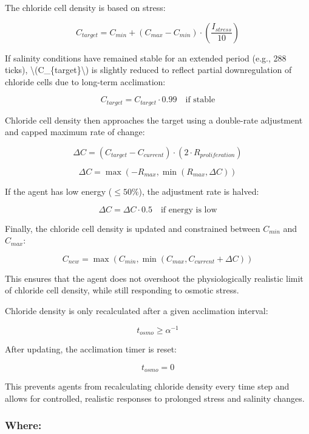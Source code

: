 \documentclass[
]{book}
\begin{document}
The chloride cell density is based on stress:

\[
C_{target} = C_{min} + (C_{max} - C_{min}) \cdot \left(\frac{I_{stress}}{10}\right)
\]

If salinity conditions have remained stable for an extended period (e.g., 288 ticks), \textbackslash(C\_\{target\}\textbackslash) is slightly reduced to reflect partial downregulation of chloride cells due to long-term acclimation:

\[
C_{target} = C_{target} \cdot 0.99 \quad \text{if stable}
\]

Chloride cell density then approaches the target using a double-rate adjustment and capped maximum rate of change:

\[
\Delta C = \left(C_{target} - C_{current}\right) \cdot \left(2 \cdot R_{proliferation}\right)
\]

\[
\Delta C = \max\left(-R_{max}, \min(R_{max}, \Delta C)\right)
\]

If the agent has low energy (\(\leq 50\%\)), the adjustment rate is halved:

\[
\Delta C = \Delta C \cdot 0.5 \quad \text{if energy is low}
\]

Finally, the chloride cell density is updated and constrained between \(C_{min}\) and \(C_{max}\):

\[
C_{new} = \max(C_{min}, \min(C_{max}, C_{current} + \Delta C))
\]

This ensures that the agent does not overshoot the physiologically realistic limit of chloride cell density, while still responding to osmotic stress.

Chloride density is only recalculated after a given acclimation interval:

\[
t_{osmo} \geq \alpha^{-1}
\]

After updating, the acclimation timer is reset:

\[
t_{osmo} = 0
\]

This prevents agents from recalculating chloride density every time step and allows for controlled, realistic responses to prolonged stress and salinity changes.

\subsubsection*{Where:}\label{where}
\end{document}
